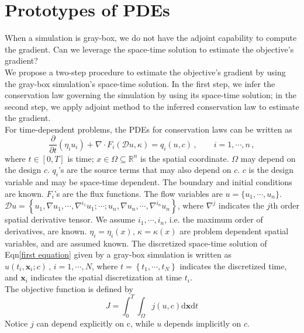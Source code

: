 \documentclass[a4paper,onecolumn]{article}
\theoremstyle{remark}
\begin{document}
\section {Prototypes of PDEs}
\label{prototypes}
\noindent When a simulation is gray-box, we do not have the adjoint capability to compute the gradient.
Can we leverage the space-time solution to estimate the objective's gradient?\\

\noindent We propose a two-step procedure to estimate the objective's gradient by using the 
gray-box simulation's space-time solution. In the first step, we infer the conservation law 
governing the simulation by using its space-time solution; in the second step, we apply
adjoint method to the inferred conservation law to estimate the gradient.\\

\noindent For time-dependent problems, the PDEs for conservation laws can be written as
\begin{equation}
    \frac{\partial}{\partial t}\left(\eta_i u_i\right) + \nabla \cdot 
    F_i(\mathcal{D} u, \kappa) 
    = q_i(u,c)\,, \qquad i=1,\cdots, n\,,
    \label{first equation}
\end{equation}
where $t\in[0,T]$ is time;
$x\in \Omega \subseteq \mathbb{R}^{n}$ is the spatial coordinate.
$\Omega$ may depend on the design $c$.
$q_i$'s are the source terms that may also depend on $c$.
$c$ is the design variable and may be space-time dependent.
The boundary and initial conditions are known. $F_i$'s are the flux functions. 
The flow variables are 
$u = \{u_1, \cdots, u_n\}$.
$\mathcal{D} u = \left\{u_1, \nabla u_1 , \cdots, \nabla^{i_1} u_1; \cdots;
u_n, \nabla u_n,\cdots, \nabla^{i_n} u_n\right\}$, where $\nabla^j$ indicates the $j$th
order spatial derivative tensor. We assume $i_1,\cdots, i_n$, i.e. the maximum 
order of derivatives, are known.
$\eta_i=\eta_i(x), \,\kappa=\kappa(x)$ are 
problem dependent spatial variables, and are assumed known. 
The discretized space-time solution of Eqn\eqref{first equation} given by a gray-box simulation
is written as $\hat{u}(t_i, \mathbf{x}_i; c)\,,\, i=1,\cdots,N$, where 
$t=\left\{t_1,\cdots, t_N\right\}$ indicates the discretized time, and 
$\mathbf{x}_i$ indicates the spatial discretization at time $t_i$.\\

\noindent The objective function is defined by
\begin{equation}
    J = \int_0^T \int_\Omega j(u,c) \textrm{d}\mathbf{x}\textrm{d}t
    \label{obj prototype}
\end{equation}
Notice $j$ can depend explicitly on c, while $u$ depends implicitly on $c$.\\
\end{document}
